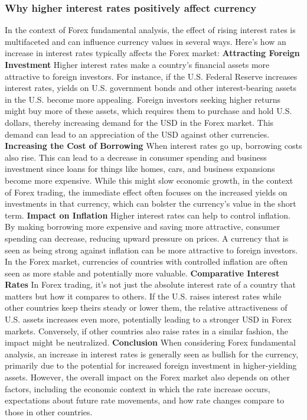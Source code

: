 \documentclass{report}
\begin{document}
     \subsubsection{Why higher interest rates positively affect currency}
     \bigbreak \noindent 
     In the context of Forex fundamental analysis, the effect of rising interest rates is multifaceted and can influence currency values in several ways. Here's how an increase in interest rates typically affects the Forex market:
     \bigbreak \noindent 
     \textbf{Attracting Foreign Investment}
     \bigbreak \noindent 
     Higher interest rates make a country's financial assets more attractive to foreign investors. For instance, if the U.S. Federal Reserve increases interest rates, yields on U.S. government bonds and other interest-bearing assets in the U.S. become more appealing. Foreign investors seeking higher returns might buy more of these assets, which requires them to purchase and hold U.S. dollars, thereby increasing demand for the USD in the Forex market. This demand can lead to an appreciation of the USD against other currencies.
     \bigbreak \noindent 
     \textbf{Increasing the Cost of Borrowing}
     \bigbreak \noindent 
     When interest rates go up, borrowing costs also rise. This can lead to a decrease in consumer spending and business investment since loans for things like homes, cars, and business expansions become more expensive. While this might slow economic growth, in the context of Forex trading, the immediate effect often focuses on the increased yields on investments in that currency, which can bolster the currency's value in the short term.
     \bigbreak \noindent 
     \textbf{Impact on Inflation}
     \bigbreak \noindent 
     Higher interest rates can help to control inflation. By making borrowing more expensive and saving more attractive, consumer spending can decrease, reducing upward pressure on prices. A currency that is seen as being strong against inflation can be more attractive to foreign investors. In the Forex market, currencies of countries with controlled inflation are often seen as more stable and potentially more valuable.
     \bigbreak \noindent 
     \textbf{Comparative Interest Rates}
     \bigbreak \noindent 
     In Forex trading, it's not just the absolute interest rate of a country that matters but how it compares to others. If the U.S. raises interest rates while other countries keep theirs steady or lower them, the relative attractiveness of U.S. assets increases even more, potentially leading to a stronger USD in Forex markets. Conversely, if other countries also raise rates in a similar fashion, the impact might be neutralized.
     \bigbreak \noindent 
     \textbf{Conclusion}
     \bigbreak \noindent 
     When considering Forex fundamental analysis, an increase in interest rates is generally seen as bullish for the currency, primarily due to the potential for increased foreign investment in higher-yielding assets. However, the overall impact on the Forex market also depends on other factors, including the economic context in which the rate increase occurs, expectations about future rate movements, and how rate changes compare to those in other countries.
\end{document}
